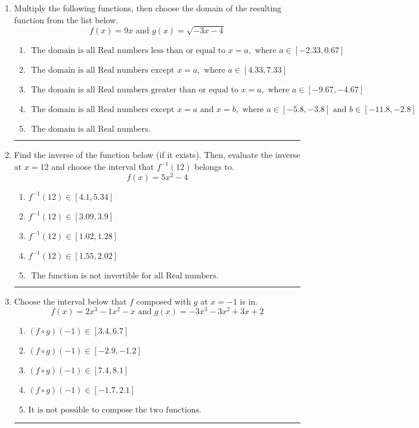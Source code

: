\documentclass[14pt]{extbook}
\newcommand{\litem}[1]{\item#1\hspace*{-1cm}\rule{\textwidth}{0.4pt}}
\begin{document}
\begin{enumerate}
{\begin{enumerate}[label=\Alph*.]
\end{enumerate} }
\litem{
Multiply the following functions, then choose the domain of the resulting function from the list below.\[ f(x) = 9x \text{ and } g(x) = \sqrt{-3x-4}  \]\begin{enumerate}[label=\Alph*.]
\item \( \text{ The domain is all Real numbers less than or equal to } x = a, \text{ where } a \in [-2.33, 0.67] \)
\item \( \text{ The domain is all Real numbers except } x = a, \text{ where } a \in [4.33, 7.33] \)
\item \( \text{ The domain is all Real numbers greater than or equal to } x = a, \text{ where } a \in [-9.67, -4.67] \)
\item \( \text{ The domain is all Real numbers except } x = a \text{ and } x = b, \text{ where } a \in [-5.8, -3.8] \text{ and } b \in [-11.8, -2.8] \)
\item \( \text{ The domain is all Real numbers. } \)

\end{enumerate} }
\litem{
Find the inverse of the function below (if it exists). Then, evaluate the inverse at $x = 12$ and choose the interval that $f^{-1}(12)$ belongs to.\[ f(x) = 5 x^2 - 4 \]\begin{enumerate}[label=\Alph*.]
\item \( f^{-1}(12) \in [4.1, 5.34] \)
\item \( f^{-1}(12) \in [3.09, 3.9] \)
\item \( f^{-1}(12) \in [1.02, 1.28] \)
\item \( f^{-1}(12) \in [1.55, 2.02] \)
\item \( \text{ The function is not invertible for all Real numbers. } \)

\end{enumerate} }
\litem{
Choose the interval below that $f$ composed with $g$ at $x=-1$ is in.\[ f(x) = 2x^{3} -1 x^{2} -x \text{ and } g(x) = -3x^{3} -3 x^{2} +3 x + 2 \]\begin{enumerate}[label=\Alph*.]
\item \( (f \circ g)(-1) \in [3.4, 6.7] \)
\item \( (f \circ g)(-1) \in [-2.9, -1.2] \)
\item \( (f \circ g)(-1) \in [7.4, 8.1] \)
\item \( (f \circ g)(-1) \in [-1.7, 2.1] \)
\item \( \text{It is not possible to compose the two functions.} \)


\end{enumerate}}
\end{enumerate}
\end{document}
